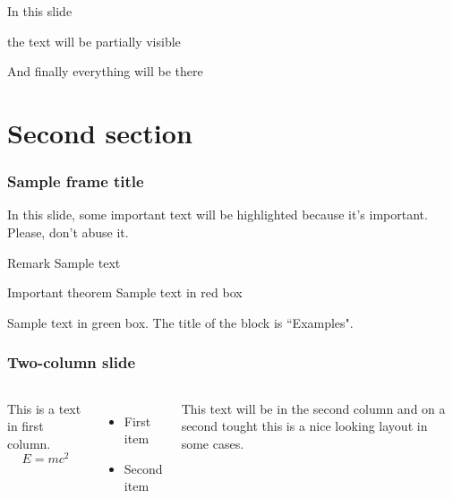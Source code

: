 \documentclass[10pt]{beamer}
\begin{document}


\begin{frame}
	In this slide \pause

	the text will be partially visible \pause

	And finally everything will be there
\end{frame}

\section{Second section}

\begin{frame}
	\frametitle{Sample frame title}

	In this slide, some important text will be
	\alert{highlighted} because it's important.
	Please, don't abuse it.

	\begin{block}{Remark}
		Sample text
	\end{block}

	\begin{alertblock}{Important theorem}
		Sample text in red box
	\end{alertblock}

	\begin{examples}
		Sample text in green box. The title of the block is ``Examples".
	\end{examples}
\end{frame}


\begin{frame}
	\frametitle{Two-column slide}
	\begin{columns}
		This is a text in first column.
		$$E=mc^2$$
		\begin{itemize}
			\item First item
			\item Second item
		\end{itemize}

		This text will be in the second column
		and on a second tought this is a nice looking
		layout in some cases.
	\end{columns}
\end{frame}
\end{document}
